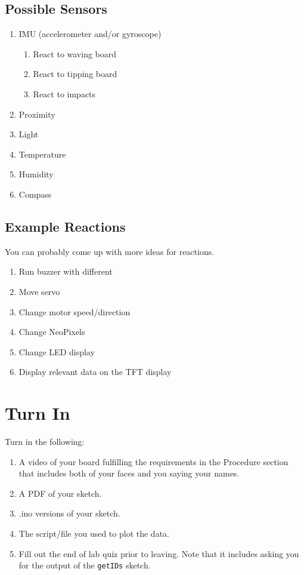 \subsection{Possible Sensors}
\begin{enumerate}
    \item IMU (accelerometer and/or gyroscope)
    \begin{enumerate}
        \item React to waving board
        \item React to tipping board 
        \item React to impacts
    \end{enumerate}
    \item Proximity
    \item Light
    \item Temperature
    \item Humidity
    \item Compass
\end{enumerate}

\subsection{Example Reactions}
You can probably come up with more ideas for reactions.
\begin{enumerate}
    \item Run buzzer with different \lstinline@tone@s 
    \item Move servo 
    \item Change motor speed/direction
    \item Change NeoPixels
    \item Change LED display
    \item Display relevant data on the TFT display
\end{enumerate}

\section{Turn In}
Turn in the following:
\begin{enumerate}
    \item A video of your board fulfilling the requirements in the Procedure section 
            that includes both of your faces and you saying your names.
    \item A PDF of your sketch.
    \item .ino versions of your sketch.
    \item The script/file you used to plot the data.
    \item Fill out the end of lab quiz prior to leaving. Note that it includes asking you 
            for the output of the \lstinline$getIDs$ sketch. 
\end{enumerate}

